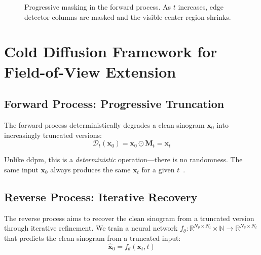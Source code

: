 \begin{figure}[htbp]
\centering
{}
\caption{Progressive masking in the forward process. As $t$ increases, edge detector columns are masked and the visible center region shrinks.}
\label{fig:progressive_masking_schedule}
\end{figure}

\section{Cold Diffusion Framework for Field-of-View Extension}

\subsection{Forward Process: Progressive Truncation}

The forward process deterministically degrades a clean sinogram $\mathbf{x}_0$ into increasingly truncated versions:
%
\begin{equation}
\mathcal{D}_t(\mathbf{x}_0) = \mathbf{x}_0 \odot \mathbf{M}_t = \mathbf{x}_t
\label{eq:forward_process}
\end{equation}

Unlike \gls{ddpm}, this is a \textit{deterministic} operation—there is no randomness. The same input $\mathbf{x}_0$ always produces the same $\mathbf{x}_t$ for a given $t$~\cite{ho2020denoising}.

\subsection{Reverse Process: Iterative Recovery}

The reverse process aims to recover the clean sinogram from a truncated version through iterative refinement. We train a neural network $f_\theta: \mathbb{R}^{N_\theta \times N_t} \times \mathbb{N} \to \mathbb{R}^{N_\theta \times N_t}$ that predicts the clean sinogram from a truncated input:
%
\begin{equation}
\hat{\mathbf{x}}_0 = f_\theta(\mathbf{x}_t, t)
\label{eq:network_prediction}
\end{equation}

